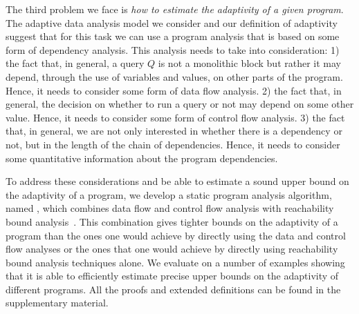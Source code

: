 The third problem we face is \emph{how to estimate the adaptivity of a given program}. 
The adaptive data analysis model we consider and our definition of adaptivity suggest that for this task we can use a  program analysis that is based on some form of dependency analysis. This analysis needs to take into consideration:
1) the fact that, in general, a query $Q$ is not a monolithic block but rather it may depend, through the use of variables and values, on other parts of the program. Hence, it needs to consider some form of data flow analysis. 
2) the fact that, in general, the decision on whether to run a query or not may depend on some other value. Hence, 
 it needs to consider some form of control flow analysis.
 3) the fact that, in general, we are not only interested in whether there is a dependency or not, but in the length of the chain of dependencies. Hence, it needs to consider some quantitative information about the program dependencies. 
 
To address these considerations and be able to estimate a sound upper bound on the adaptivity of a program, 
we develop a static program analysis algorithm, named {\THESYSTEM}, which combines data flow and control flow analysis with reachability bound analysis~\cite{GulwaniZ10}. This combination gives tighter bounds on the adaptivity of a program than the ones one would achieve by directly using the data and control flow analyses or the ones that one would achieve by directly using reachability bound analysis techniques alone. We evaluate {\THESYSTEM} on a number of examples showing that it is able to efficiently estimate precise upper bounds on the adaptivity of different programs. 
All the proofs and extended definitions can be found in the supplementary material.

